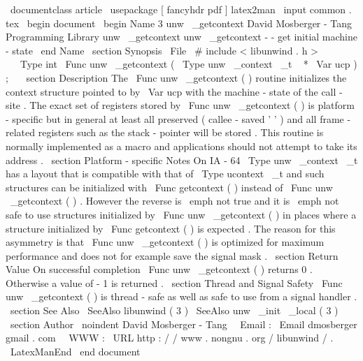 \
documentclass
{
article
}
\
usepackage
[
fancyhdr
pdf
]
{
latex2man
}
\
input
{
common
.
tex
}
\
begin
{
document
}
\
begin
{
Name
}
{
3
}
{
unw
\
_getcontext
}
{
David
Mosberger
-
Tang
}
{
Programming
Library
}
{
unw
\
_getcontext
}
unw
\
_getcontext
-
-
get
initial
machine
-
state
\
end
{
Name
}
\
section
{
Synopsis
}
\
File
{
\
#
include
<
libunwind
.
h
>
}
\
\
\
Type
{
int
}
\
Func
{
unw
\
_getcontext
}
(
\
Type
{
unw
\
_context
\
_t
~
*
}
\
Var
{
ucp
}
)
;
\
\
\
section
{
Description
}
The
\
Func
{
unw
\
_getcontext
}
(
)
routine
initializes
the
context
structure
pointed
to
by
\
Var
{
ucp
}
with
the
machine
-
state
of
the
call
-
site
.
The
exact
set
of
registers
stored
by
\
Func
{
unw
\
_getcontext
}
(
)
is
platform
-
specific
but
in
general
at
least
all
preserved
(
callee
-
saved
'
'
)
and
all
frame
-
related
registers
such
as
the
stack
-
pointer
will
be
stored
.
This
routine
is
normally
implemented
as
a
macro
and
applications
should
not
attempt
to
take
its
address
.
\
section
{
Platform
-
specific
Notes
}
On
IA
-
64
\
Type
{
unw
\
_context
\
_t
}
has
a
layout
that
is
compatible
with
that
of
\
Type
{
ucontext
\
_t
}
and
such
structures
can
be
initialized
with
\
Func
{
getcontext
}
(
)
instead
of
\
Func
{
unw
\
_getcontext
}
(
)
.
However
the
reverse
is
\
emph
{
not
}
true
and
it
is
\
emph
{
not
}
safe
to
use
structures
initialized
by
\
Func
{
unw
\
_getcontext
(
)
}
in
places
where
a
structure
initialized
by
\
Func
{
getcontext
(
)
}
is
expected
.
The
reason
for
this
asymmetry
is
that
\
Func
{
unw
\
_getcontext
(
)
}
is
optimized
for
maximum
performance
and
does
not
for
example
save
the
signal
mask
.
\
section
{
Return
Value
}
On
successful
completion
\
Func
{
unw
\
_getcontext
}
(
)
returns
0
.
Otherwise
a
value
of
-
1
is
returned
.
\
section
{
Thread
and
Signal
Safety
}
\
Func
{
unw
\
_getcontext
}
(
)
is
thread
-
safe
as
well
as
safe
to
use
from
a
signal
handler
.
\
section
{
See
Also
}
\
SeeAlso
{
libunwind
(
3
)
}
\
SeeAlso
{
unw
\
_init
\
_local
(
3
)
}
\
section
{
Author
}
\
noindent
David
Mosberger
-
Tang
\
\
Email
:
\
Email
{
dmosberger
gmail
.
com
}
\
\
WWW
:
\
URL
{
http
:
/
/
www
.
nongnu
.
org
/
libunwind
/
}
.
\
LatexManEnd
\
end
{
document
}
